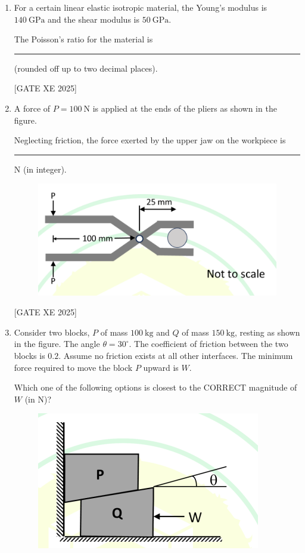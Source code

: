 \documentclass[journal,12pt,onecolumn]{IEEEtran}
\theoremstyle{remark}
\begin{document}
\begin{enumerate}
\hfill[GATE XE 2025]


\item For a certain linear elastic isotropic material, the Young’s modulus is $140~\text{GPa}$ and the shear modulus is $50~\text{GPa}$.

The Poisson’s ratio for the material is \rule{3cm}{0.15mm} (rounded off up to two decimal places).


\hfill[GATE XE 2025]


\item A force of $P=100~\text{N}$ is applied at the ends of the pliers as shown in the figure.

Neglecting friction, the force exerted by the upper jaw on the workpiece is \rule{3cm}{0.15mm} N (in integer).
\begin{figure}[H]
    \centering
    \includegraphics[width=0.5\columnwidth]{figs/fig19.png}
    \caption{}
    \label{fig:placeholder}
\end{figure}

\hfill[GATE XE 2025]


\item Consider two blocks, $P$ of mass $100~\text{kg}$ and $Q$ of mass $150~\text{kg}$, resting as shown in the figure. The angle $\theta=30^\circ$. The coefficient of friction between the two blocks is $0.2$. Assume no friction exists at all other interfaces. The minimum force required to move the block $P$ upward is $W$.

Which one of the following options is closest to the CORRECT magnitude of $W$ (in N)?
\begin{figure}[H]
    \centering
    \includegraphics[width=0.5\columnwidth]{figs/fig20.png}
    \caption{}
    \label{fig:placeholder}
\end{figure}


\end{enumerate}
\end{document}
